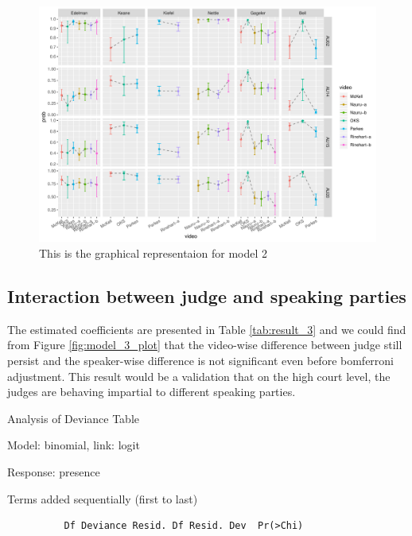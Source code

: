 \documentclass{monashthesis}
\begin{document}
\begin{figure}

{\centering \includegraphics[width=1\linewidth]{figures/unnamed-chunk-11-1} 

}

\caption{This is the graphical representaion for model 2\label{fig:model_2_plot}}\label{fig:unnamed-chunk-11}
\end{figure}

\hypertarget{interaction-between-judge-and-speaking-parties}{%
\subsection{Interaction between judge and speaking parties}\label{interaction-between-judge-and-speaking-parties}}

The estimated coefficients are presented in Table \ref{tab:result_3} and we could find from Figure \ref{fig:model_3_plot} that the video-wise difference between judge still persist and the speaker-wise difference is not significant even before bomferroni adjustment. This result would be a validation that on the high court level, the judges are behaving impartial to different speaking parties.

Analysis of Deviance Table

Model: binomial, link: logit

Response: presence

Terms added sequentially (first to last)

\begin{verbatim}
          Df Deviance Resid. Df Resid. Dev  Pr(>Chi)    
\end{verbatim}
\end{document}
